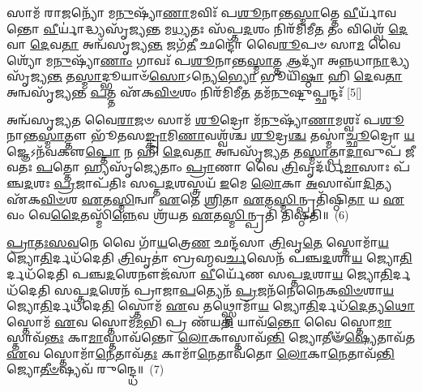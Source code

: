 𑌸𑌾𑌮᳴ 𑌰𑌾\-\ul{𑌜}\-𑌨𑍍𑌯𑍋᳴ 𑌮\-\ul{𑌨𑍁}\-𑌷𑍍𑌯𑌾᳴\-\ul{𑌣𑌾}\-𑌮𑌵𑌿𑌃᳴ 𑌪\-\ul{𑌶𑍂}\-𑌨𑌾𑌨𑍍𑌤\-\ul{𑌸𑍍𑌮𑌾}\-𑌤𑍍𑌤𑍇 \ul{𑌵𑍀}\-𑌰𑍍𑌯𑌾᳴𑌵𑌨𑍍𑌤𑍋 \ul{𑌵𑍀}\-𑌰𑍍𑌯𑌾॑𑌦𑍍𑌧𑍍𑌯𑌸𑍃᳴𑌜𑍍𑌯𑌨𑍍𑌤 𑌮\-\ul{𑌧𑍍𑌯}\-𑌤𑌃 𑌸᳴𑌪𑍍𑌤\-\ul{𑌦}\-𑌶𑌂 𑌨𑌿𑌰᳴𑌮𑌿𑌮𑍀\-\ul{𑌤} 𑌤𑌂 𑌵𑌿𑌶𑍍𑌵𑍇᳴ \ul{𑌦𑍇}\-𑌵𑌾 \ul{𑌦𑍇}\-𑌵\-\ul{𑌤𑌾} 𑌅𑌨𑍍𑌵᳴𑌸𑍃𑌜𑍍𑌯\-\ul{𑌨𑍍𑌤} 𑌜𑌗᳴\-\ul{𑌤𑍀} 𑌛𑌨𑍍𑌦𑍋᳴ 𑌵𑍈\-\ul{𑌰𑍂}\-𑌪𑍞 𑌸𑌾\-\ul{𑌮} 𑌵𑍈𑌶𑍍𑌯𑍋᳴ 𑌮\-\ul{𑌨𑍁}\-𑌷𑍍𑌯𑌾᳴\-\ul{𑌣𑌾𑌂} 𑌗𑌾𑌵𑌃᳴ 𑌪\-\ul{𑌶𑍂}\-𑌨𑌾𑌨𑍍𑌤\-\ul{𑌸𑍍𑌮𑌾}\-𑌤𑍍𑌤 \ul{𑌆}\-𑌦𑍍𑌯𑌾᳴ 𑌅\-\ul{𑌨𑍍𑌨}\-𑌧𑌾\-\ul{𑌨𑌾}\-\-𑌦𑍍𑌧𑍍𑌯𑌸𑍃᳴𑌜𑍍𑌯\-\ul{𑌨𑍍𑌤} 𑌤\-\ul{𑌸𑍍𑌮𑌾}\-𑌦𑍍𑌭𑍂𑌯𑌾𑍞᳴\-\ul{𑌸𑍋}\-\-𑌽𑌨𑍍𑌯𑍇\-\ul{𑌭𑍍𑌯𑍋} 𑌭𑍂𑌯𑌿᳴\-\ul{𑌷𑍍𑌠𑌾} 𑌹𑌿 \ul{𑌦𑍇}\-𑌵\-\ul{𑌤𑌾} 𑌅𑌨𑍍𑌵𑌸𑍃᳴𑌜𑍍𑌯𑌨𑍍𑌤 \ul{𑌪}\-𑌤𑍍𑌤 𑌏᳴𑌕\-\ul{𑌵𑌿}\-\-\ul{𑍞}\-𑌶𑌂 𑌨𑌿𑌰᳴𑌮𑌿𑌮𑍀\-\ul{𑌤} 𑌤𑌮᳴\-\ul{𑌨𑍁}\-𑌷𑍍𑌟𑍁𑌪𑍍𑌛𑌨𑍍𑌦𑌃᳴ [5[]

𑌅𑌨𑍍𑌵᳴𑌸𑍃𑌜𑍍𑌯𑌤 𑌵𑍈\-\ul{𑌰𑌾}\-𑌜𑍞 𑌸𑌾𑌮᳴ \ul{𑌶𑍂}\-𑌦𑍍𑌰𑍋 𑌮᳴\-\ul{𑌨𑍁}\-𑌷𑍍𑌯𑌾᳴\-\ul{𑌣𑌾}\-𑌮𑌶𑍍𑌵𑌃᳴ 𑌪\-\ul{𑌶𑍂}\-𑌨𑌾𑌨𑍍𑌤\-\ul{𑌸𑍍𑌮𑌾}\-𑌤𑍍𑌤𑍗 𑌭𑍂᳴𑌤𑌸\-\ul{𑌙𑍍𑌕𑍍𑌰𑌾}\-𑌮𑌿\-\ul{𑌣𑌾}\-𑌵𑌶𑍍𑌵᳴𑌶𑍍𑌚 \ul{𑌶𑍂}\-𑌦𑍍𑌰\-\ul{𑌶𑍍𑌚} 𑌤𑌸𑍍𑌮𑌾॑\-\ul{𑌚𑍍𑌛𑍂}\-𑌦𑍍𑌰𑍋 \ul{𑌯}\-𑌜𑍍𑌞𑍇\-𑌽𑌨᳴𑌵𑌕𑍢\-\ul{𑌪𑍍𑌤𑍋} 𑌨 𑌹𑌿 \ul{𑌦𑍇}\-𑌵\-\ul{𑌤𑌾} 𑌅𑌨𑍍𑌵𑌸𑍃᳴𑌜𑍍𑌯\-\ul{𑌤} 𑌤\-\ul{𑌸𑍍𑌮𑌾}\-𑌤𑍍𑌪𑌾\-\ul{𑌦𑌾}\-𑌵𑍁𑌪᳴ 𑌜𑍀𑌵𑌤𑌃 \ul{𑌪}\-𑌤𑍍𑌤𑍋 𑌹𑍍𑌯𑌸𑍃᳴𑌜𑍍𑌯𑍇𑌤𑌾𑌂 \ul{𑌪𑍍𑌰𑌾}\-𑌣𑌾 𑌵𑍈 \ul{𑌤𑍍𑌰𑌿}\-𑌵𑍃𑌦᳴𑌰𑍍𑌧\-\ul{𑌮𑌾}\-𑌸𑌾𑌃 𑌪᳴𑌞𑍍𑌚\-\ul{𑌦}\-𑌶𑌃 \ul{𑌪𑍍𑌰}\-𑌜𑌾𑌪᳴𑌤𑌿𑌃 𑌸𑌪𑍍𑌤\-\ul{𑌦}\-𑌶𑌸𑍍𑌤𑍍𑌰𑌯᳴ \ul{𑌇}\-𑌮𑍇 \ul{𑌲𑍋}\-𑌕𑌾 \ul{𑌅}\-𑌸𑌾𑌵𑌾᳴\-\ul{𑌦𑌿}\-𑌤𑍍𑌯 𑌏᳴𑌕\-\ul{𑌵𑌿}\-\-\ul{𑍞}\-𑌶 \ul{𑌏}\-𑌤\-\ul{𑌸𑍍𑌮𑌿}\-𑌨𑍍𑌵𑌾 \ul{𑌏}\-𑌤𑍇 \ul{𑌶𑍍𑌰𑌿}\-𑌤𑌾 \ul{𑌏}\-𑌤\-\ul{𑌸𑍍𑌮𑌿}\-𑌨𑍍𑌪𑍍𑌰𑌤𑌿᳴𑌷𑍍𑌠𑌿\-\ul{𑌤𑌾} 𑌯 \ul{𑌏}\-𑌵𑌂 𑌵𑍇\-\ul{𑌦𑍈}\-𑌤𑌸𑍍𑌮𑌿᳴\-\ul{𑌨𑍍𑌨𑍇}\-𑌵 𑌶𑍍𑌰᳴𑌯𑌤 \ul{𑌏}\-𑌤\-\ul{𑌸𑍍𑌮𑌿}\-𑌨𑍍𑌪𑍍𑌰𑌤𑌿᳴ 𑌤𑌿𑌷𑍍𑌠𑌤𑌿॥~(6)

{\anuvakamend[{𑌅𑌸𑍍𑌥𑍂᳴\-\ul{𑌰𑌿}\-𑌰𑍋𑌷᳴𑌧𑍀𑌷𑍁 𑌜𑍍𑌯𑍇𑌷𑍍𑌠\-\ul{𑌯}\-𑌜𑍍𑌞 𑌇𑌤𑌿᳴ \ul{𑌬𑍃}\-𑌹𑌦᳴\-\ul{𑌨𑍁}\-𑌷𑍍𑌟𑍁𑌪𑍍𑌛\-\ul{𑌨𑍍𑌦𑌃} 𑌪𑍍𑌰𑌤𑌿᳴𑌷𑍍𑌠𑌿\-\ul{𑌤𑌾} 𑌨𑌵᳴ 𑌚}]}%

\-\ul{𑌪𑍍𑌰𑌾}\-\-\ul{𑌤𑌃}\-\-\ul{𑌸}\-\-\ul{𑌵}\-𑌨𑍇 𑌵𑍈 𑌗𑌾᳴\-\ul{𑌯}\-𑌤𑍍𑌰𑍇\-\ul{𑌣} 𑌛𑌨𑍍𑌦᳴𑌸𑌾 \ul{𑌤𑍍𑌰𑌿}\-𑌵𑍃\-\ul{𑌤𑍇} 𑌸𑍍𑌤𑍋𑌮𑌾᳴\-\ul{𑌯} 𑌜𑍍𑌯𑍋\-\ul{𑌤𑌿}\-𑌰𑍍𑌦𑌧᳴𑌦𑍇𑌤𑌿 \ul{𑌤𑍍𑌰𑌿}\-𑌵𑍃𑌤𑌾॑ 𑌬𑍍𑌰𑌹𑍍𑌮𑌵\-\ul{𑌰𑍍𑌚}\-𑌸𑍇𑌨᳴ 𑌪𑌞𑍍𑌚\-\ul{𑌦}\-𑌶𑌾\-\ul{𑌯} 𑌜𑍍𑌯𑍋\-\ul{𑌤𑌿}\-𑌰𑍍𑌦𑌧᳴𑌦𑍇𑌤𑌿 𑌪𑌞𑍍𑌚\-\ul{𑌦}\-𑌶𑍇𑌨𑍗𑌜᳴𑌸𑌾 \ul{𑌵𑍀}\-𑌰𑍍𑌯𑍇᳴𑌣 𑌸𑌪𑍍𑌤\-\ul{𑌦}\-𑌶𑌾\-\ul{𑌯} 𑌜𑍍𑌯𑍋\-\ul{𑌤𑌿}\-𑌰𑍍𑌦𑌧᳴𑌦𑍇𑌤𑌿 𑌸𑌪𑍍𑌤\-\ul{𑌦}\-𑌶𑍇𑌨᳴ 𑌪𑍍𑌰𑌾𑌜𑌾\-\ul{𑌪}\-𑌤𑍍𑌯𑍇𑌨᳴ \ul{𑌪𑍍𑌰}\-𑌜𑌨᳴𑌨𑍇𑌨𑍈𑌕\-\ul{𑌵𑌿}\-\-\ul{𑍞}\-𑌶𑌾\-\ul{𑌯} 𑌜𑍍𑌯𑍋\-\ul{𑌤𑌿}\-𑌰𑍍𑌦𑌧᳴𑌦𑍇\-\ul{𑌤𑌿} 𑌸𑍍𑌤𑍋𑌮᳴ \ul{𑌏}\-𑌵 𑌤𑌥𑍍𑌸𑍍𑌤𑍋𑌮𑌾᳴\-\ul{𑌯} 𑌜𑍍𑌯𑍋\-\ul{𑌤𑌿}\-𑌰𑍍𑌦𑌧᳴\-\ul{𑌦𑍇}\-𑌤𑍍𑌯\-\ul{𑌥𑍋} 𑌸𑍍𑌤𑍋𑌮᳴ \ul{𑌏}\-𑌵 𑌸𑍍𑌤𑍋𑌮᳴\-\ul{𑌮}\-𑌭𑌿 𑌪𑍍𑌰 𑌣᳴𑌯\-\ul{𑌤𑌿} 𑌯𑌾𑌵᳴\-\ul{𑌨𑍍𑌤𑍋} 𑌵𑍈 𑌸𑍍𑌤𑍋\-\ul{𑌮𑌾}\-𑌸𑍍𑌤𑌾𑌵᳴\-\ul{𑌨𑍍𑌤𑌃} 𑌕𑌾\-\ul{𑌮𑌾}\-𑌸𑍍𑌤𑌾𑌵᳴𑌨𑍍𑌤𑍋 \ul{𑌲𑍋}\-𑌕𑌾𑌸𑍍𑌤𑌾𑌵᳴\-\ul{𑌨𑍍𑌤𑌿} 𑌜𑍍𑌯𑍋𑌤𑍀𑍟᳴\-\ul{𑌷𑍍𑌯𑍇}\-𑌤𑌾𑌵᳴𑌤 \ul{𑌏}\-𑌵 𑌸𑍍𑌤𑍋𑌮𑌾᳴\-\ul{𑌨𑍇}\-𑌤𑌾𑌵᳴\-\ul{𑌤𑌃} 𑌕𑌾𑌮𑌾᳴\-\ul{𑌨𑍇}\-𑌤𑌾𑌵᳴𑌤𑍋 \ul{𑌲𑍋}\-𑌕𑌾\-\ul{𑌨𑍇}\-𑌤𑌾𑌵᳴\-\ul{𑌨𑍍𑌤𑌿} 𑌜𑍍𑌯𑍋\-\ul{𑌤𑍀}\-\-\ul{𑍞}\-𑌷𑍍𑌯𑌵᳴ 𑌰𑍁𑌨𑍍𑌦𑍍𑌧𑍇॥~(7)

{\anuvakamend[{𑌤𑌾𑌵᳴𑌨𑍍𑌤𑍋 \ul{𑌲𑍋}\-𑌕𑌾𑌸𑍍𑌤𑍍𑌰𑌯𑍋᳴𑌦𑌶 𑌚}]}%

